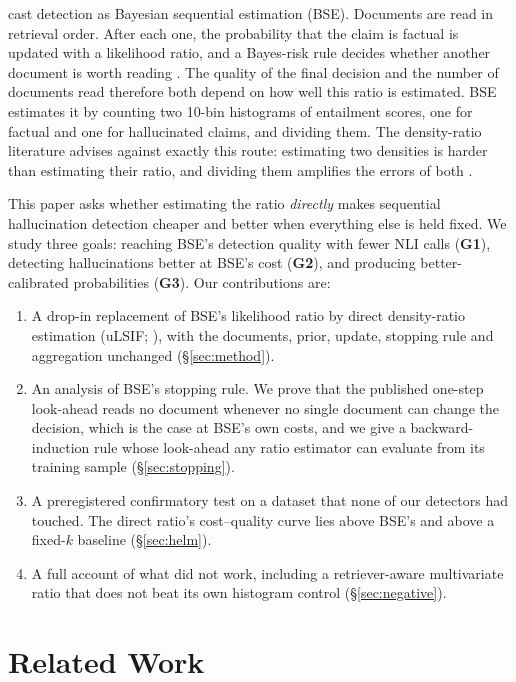 \documentclass[11pt]{article}
\begin{document}
\citet{wang-etal-2023-hallucination} cast detection as Bayesian sequential
estimation (BSE). Documents are read in retrieval order. After each one, the
probability that the claim is factual is updated with a likelihood ratio, and
a Bayes-risk rule decides whether another document is worth reading
\citep{wald1945sequential}. The quality of the final decision and the number
of documents read therefore both depend on how well this ratio is estimated.
BSE estimates it by counting two 10-bin histograms of entailment scores, one
for factual and one for hallucinated claims, and dividing them. The
density-ratio literature advises against exactly this route: estimating two
densities is harder than estimating their ratio, and dividing them amplifies
the errors of both \citep{sugiyama2012density}.

This paper asks whether estimating the ratio \emph{directly} makes sequential
hallucination detection cheaper and better when everything else is held
fixed. We study three goals: reaching BSE's detection quality with fewer NLI
calls (\textbf{G1}), detecting hallucinations better at BSE's cost
(\textbf{G2}), and producing better-calibrated probabilities (\textbf{G3}).
Our contributions are:

\begin{enumerate}
\item A drop-in replacement of BSE's likelihood ratio by direct density-ratio
estimation (uLSIF; \citealp{kanamori2009ulsif}), with the documents, prior,
update, stopping rule and aggregation unchanged (\S\ref{sec:method}).
\item An analysis of BSE's stopping rule. We prove that the published one-step
look-ahead reads no document whenever no single document can change the
decision, which is the case at BSE's own costs, and we give a
backward-induction rule whose look-ahead any ratio estimator can evaluate
from its training sample (\S\ref{sec:stopping}).
\item A preregistered confirmatory test on a dataset that none of our
detectors had touched. The direct ratio's cost--quality curve lies above
BSE's and above a fixed-$k$ baseline (\S\ref{sec:helm}).
\item A full account of what did not work, including a retriever-aware
multivariate ratio that does not beat its own histogram control
(\S\ref{sec:negative}).
\end{enumerate}

\section{Related Work}
\end{document}
